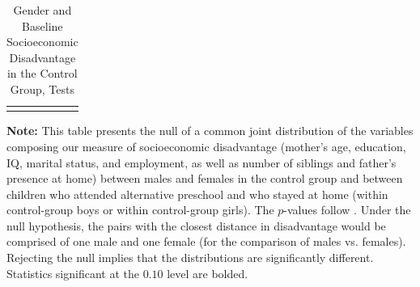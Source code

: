 \begin{table}[!htpb]
\begin{threeparttable}
\caption{Gender and Baseline Socioeconomic Disadvantage in the Control Group, Tests} \label{table:disadtests}
\centering 
\begin{tabularx}{16.5cm}{XcX}
&  & 
\end{tabularx}
\begin{tablenotes}
\footnotesize
\item \textbf{Note:} This table presents the null of a common joint distribution of the variables composing our measure of socioeconomic disadvantage (mother's age, education, IQ, marital status, and employment, as well as number of siblings and father's presence at home) between males and females in the control group and between children who attended  alternative preschool and who stayed at home (within control-group boys or within control-group girls). The $p$-values follow \citet{Rosenbaum_2005_Distribution_JRSS}. Under the null hypothesis, the pairs with the closest distance in disadvantage would be comprised of one male and one female (for the comparison of males vs. females). Rejecting the null implies that the distributions are significantly different. Statistics significant at the $0.10$ level are bolded.
\end{tablenotes}
\end{threeparttable}
\end{table}










